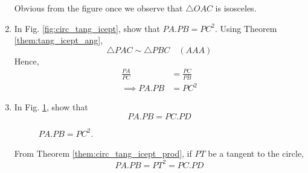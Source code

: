 \begin{enumerate}[label=\thesection.\arabic*.,ref=\thesection.\theenumi]
%
\solution Obvious from the figure once we observe that $\triangle OAC$ is isosceles.
%
%
\item
	In Fig. \ref{fig:circ_tang_icept}, show that $PA.PB = PC^2$.
\label{them:circ_tang_icept_prod}	
\solution Using Theorem \ref{them:tang_icept_ang},
\begin{equation}
\triangle PAC \sim \triangle PBC \quad (AAA)
\end{equation}
 Hence,
%
\begin{align}
\frac{PA}{PC} &= \frac{PC}{PB} \\
\implies PA.PB &=PC^2
\end{align}
%
%
%
\item
	In Fig. \ref{fig:chord_tang_prod}, show that
\begin{equation}
	PA.PB = PC.PD
	\end{equation}

%
\begin{figure}[!ht]
	\begin{center}
		
		\resizebox{\columnwidth}{!}{}
	\end{center}
	\caption{$PA.PB = PC^2$.}
	\label{fig:chord_tang_prod}	
\end{figure}

\solution From Theorem \ref{them:circ_tang_icept_prod}, if $PT$ be a tangent to the circle, 	
\begin{equation}
	PA.PB = PT^2 =PC.PD
	\end{equation}
	\fi
\end{enumerate}
%
%
%		


